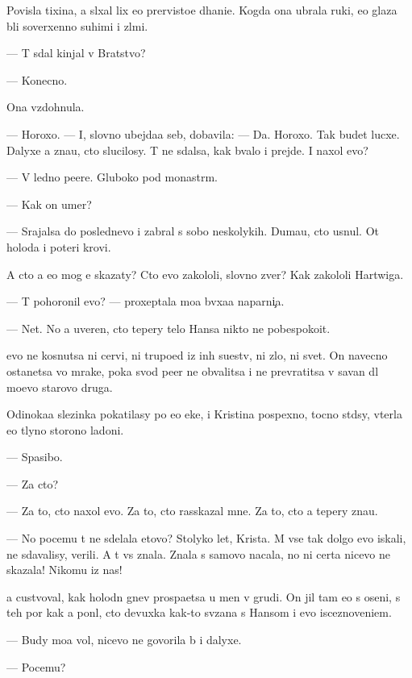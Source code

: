 \documentclass[10pt]{book}
\begin{document}
Povisla tixina, {\y}a sl{\yi}xal lix {\y}e{\y}o prer{\yi}visto{\y}e d{\yi}hani{\y}e. Kogda ona ubrala ruki, {\y}e{\y}o glaza b{\yi}li soverxenno suhimi i zl{\yi}mi.

— T{\yi} sdal kinjal v Bratstvo?

— Konecno.

Ona vzdohnula.

— Horoxo. — I, slovno ubejda{\y}a seb{\ia}, dobavila: — Da. Horoxo. Tak budet lucxe. Dalyxe {\y}a zna{\y}u, cto slucilosy. T{\yi} ne sdalsa, kak b{\yi}valo i prejde. I naxol {\y}evo?

— V led{\ia}no{\y} pe{\x}ere. Gluboko pod monast{\yi}r{\e}m.

— Kak on umer?

— Srajalsa do poslednevo i zabral s sobo{\y} neskolykih. Duma{\y}u, cto usnul. Ot holoda i poteri krovi.

A cto {\y}a {\y}e{\x}o mog {\y}e{\y} skazaty? Cto {\y}evo zakololi, slovno zver{\ia}? Kak zakololi Hartwiga.

— T{\yi} pohoronil {\y}evo? — proxeptala mo{\y}a b{\yi}vxa{\y}a naparni{\c}a.

— Net. No {\y}a uveren, cto tepery telo Hansa nikto ne pobespoko{\y}it.

{\Y}evo ne kosnutsa ni cervi, ni trupo{\y}ed{\yi} iz in{\yi}h su{\x}estv, ni zlo, ni svet. On navecno ostanetsa vo mrake, poka svod pe{\x}er{\yi} ne obvalitsa i ne prevratitsa v savan dl{\ia} mo{\y}evo starovo druga.

Odinoka{\y}a slezinka pokatilasy po {\y}e{\y}o {\x}eke, i Kristina pospexno, tocno st{\yi}d{\ia}sy, v{\yi}terla {\y}e{\y}o t{\yi}lyno{\y} storono{\y} ladoni.

— Spasibo.

— Za cto?

— Za to, cto naxol {\y}evo. Za to, cto rasskazal mne. Za to, cto {\y}a tepery zna{\y}u.

— No pocemu t{\yi} ne sdelala etovo? Stolyko let, Krista. M{\yi} vse tak dolgo {\y}evo iskali, ne sdavalisy, verili. A t{\yi} vs{\e} znala. Znala s samovo nacala, no ni certa nicevo ne skazala! Nikomu iz nas!

{\Y}a custvoval, kak holodn{\yi}{\y} gnev pros{\yi}pa{\y}etsa u men{\ia} v grudi. On jil tam {\y}e{\x}o s oseni, s teh por kak {\y}a pon{\ia}l, cto devuxka kak-to sv{\ia}zana s Hansom i {\y}evo isceznoveni{\y}em.

— Budy mo{\y}a vol{\ia}, nicevo ne govorila b{\yi} i dalyxe.

— Pocemu?
\end{document}

